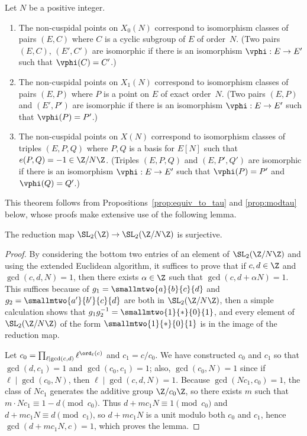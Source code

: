 \documentclass{report}
\begin{document}
\begin{theorem}\label{thm:paramcurves}
Let $N$ be a positive integer.%
\begin{enumerate}%
\item The non-cuspidal points on $X_0(N)$ correspond to isomorphism
  classes of pairs $(E,C)$ where $C$ is a cyclic subgroup of $E$ of
  order~$N$.  (Two pairs $(E,C)$, $(E',C')$ are isomorphic if there is
  an isomorphism $\vphi:E\to E'$ such that $\vphi(C)=C'$.)%
\item The non-cuspidal points on $X_1(N)$ correspond to isomorphism
  classes of pairs $(E,P)$ where $P$ is a point on $E$ of exact
  order~$N$. (Two pairs $(E,P)$ and $(E',P')$ are isomorphic if there
  is an isomorphism $\vphi:E\to E'$ such that $\vphi(P) = P'$.)%
\item The non-cuspidal points on $X(N)$ correspond to isomorphism
  classes of triples $(E,P,Q)$ where $P,Q$ is a basis for $E[N]$ such
  that $e(P,Q)=-1\in\Z/N\Z$.  (Triples $(E,P,Q)$ and $(E,P',Q')$ are
  isomorphic if there is an isomorphism $\vphi:E \to E'$ such that
  $\vphi(P) = P'$ and $\vphi(Q) = Q'$.)
\end{enumerate}
\end{theorem}
This theorem follows from Propositions~\ref{prop:equiv_to_tau} and
\ref{prop:modtau} below, whose proofs make extensive use of the
following lemma.

\begin{lemma}\label{lem:red}
The reduction
map $\SL_2(\Z)\to\SL_2(\Z/N\Z)$
is surjective.
\end{lemma}
\begin{proof}
  By considering the bottom two entries of an element of
  $\SL_2(\Z/N\Z)$ and using the extended Euclidean algorithm, it
  suffices to prove that if $c,d\in\Z$ and $\gcd(c,d,N)=1$, then there
  exists $\alpha\in\Z$ such that $\gcd(c,d+\alpha N)=1$.
This suffices because of $g_1 = \smallmtwo{a}{b}{c}{d}$ and $g_2 = \smallmtwo{a'}{b'}{c}{d}$
are both in $\SL_2(\Z/N\Z)$, then a simple calculation shows that
$g_1 g_2^{-1} = \smallmtwo{1}{*}{0}{1}$, and every element of $\SL_2(\Z/N\Z)$
of the form $\smallmtwo{1}{*}{0}{1}$ is in the image of the reduction map.

Let $c_0 =
  \prod_{\ell\mid \gcd(c,d)}\ell^{\ord_{\ell}(c)}$ and $c_1 = c/c_0$.
  We have constructed $c_0$ and $c_1$ so that $\gcd(d,c_1)=1$ and
  $\gcd(c_0, c_1)=1$; also, $\gcd(c_0,N)=1$ since if $\ell\mid
  \gcd(c_0,N)$, then $\ell\mid \gcd(c,d,N)=1$.  Because $\gcd(N c_1,
  c_0)=1$, the class of $N c_1$ generates the additive group
  $\Z/c_0\Z$, so there exists $m$ such that $m\cdot Nc_1 \equiv
  1-d\pmod{c_0}$.  Thus $d+mc_1N \equiv 1 \pmod{c_0}$ and $d+mc_1N
  \equiv d\pmod{c_1}$, so $d+mc_1N$ is a unit modulo both $c_0$ and
  $c_1$, hence $\gcd(d +mc_1N, c)=1$, which proves the lemma.
\end{proof}
\end{document}

